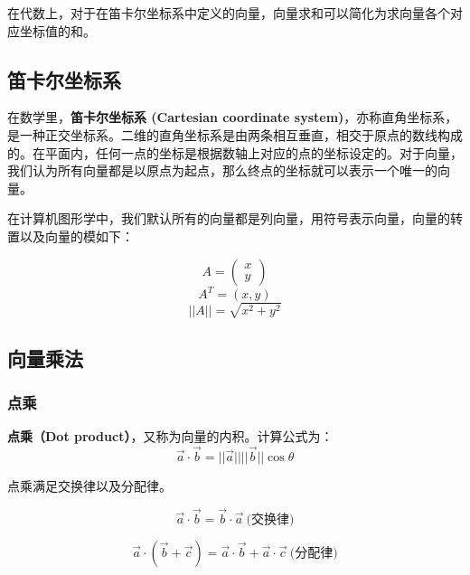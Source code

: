\documentclass[openany]{progbookcn}
\begin{document}
在代数上，对于在笛卡尔坐标系中定义的向量，向量求和可以简化为求向量各个对应坐标值的和。

\subsection{笛卡尔坐标系}
在数学里，\textbf{笛卡尔坐标系 (Cartesian coordinate system)}，亦称直角坐标系，是一种正交坐标系。二维的直角坐标系是由两条相互垂直，相交于原点的数线构成的。在平面内，任何一点的坐标是根据数轴上对应的点的坐标设定的。对于向量，我们认为所有向量都是以原点为起点，那么终点的坐标就可以表示一个唯一的向量。

在计算机图形学中，我们默认所有的向量都是列向量，用符号表示向量，向量的转置以及向量的模如下：

\begin{equation}
A=\begin{pmatrix}
x\\ 
y
\end{pmatrix}
\end{equation}
\begin{equation}
A^T=(x,y)
\end{equation}
\begin{equation}
||A||=\sqrt{x^2+y^2}
\end{equation}

\subsection{向量乘法}

\subsubsection{点乘}

\textbf{点乘（Dot product）}，又称为向量的内积。计算公式为：
\begin{equation}
	\overrightarrow{a} \cdot \overrightarrow{b} = ||\overrightarrow{a}||||\overrightarrow{b}||\cos\theta
\end{equation}

点乘满足交换律以及分配律。

\begin{equation}
	\overrightarrow{a} \cdot \overrightarrow{b} = \overrightarrow{b} \cdot \overrightarrow{a}\ \text{(交换律)}
\end{equation}


\begin{equation}
	\overrightarrow{a} \cdot (\overrightarrow{b}+\overrightarrow{c}) = \overrightarrow{a} \cdot \overrightarrow{b}+\overrightarrow{a} \cdot \overrightarrow{c}\ \text{(分配律)}
\end{equation}
\end{document}
